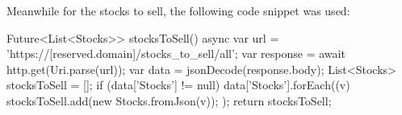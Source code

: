 Meanwhile for the stocks to sell, the following code
snippet was used:
\hfill \\
\begin{python}
Future<List<Stocks>> stocksToSell() async {
      var url = 'https://[reserved.domain]/stocks_to_sell/all';
      var response = await http.get(Uri.parse(url));
      var data = jsonDecode(response.body);
      List<Stocks> stocksToSell = [];
      if (data['Stocks'] != null) {
        data['Stocks'].forEach((v) {
          stocksToSell.add(new Stocks.fromJson(v));
        });
      }
      return stocksToSell;
    }
\end{python}
